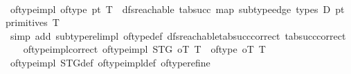 \begin{isabellebody}
\endisatagproof
{\isafoldproof}%
%
\isadelimproof
\isanewline
%
\endisadelimproof
\isanewline
\ \ \isamarkupfalse%
\ of{\isacharunderscore}{\kern0pt}type{}{\isacharunderscore}{\kern0pt}impl{\isacharcolon}{\kern0pt}\ {\isachardoublequoteopen}of{\isacharunderscore}{\kern0pt}type{}\ pt\ T\ {\isasymlongleftrightarrow}\ dfs{\isacharunderscore}{\kern0pt}reachable\ {\isacharparenleft}{\kern0pt}tab{\isacharunderscore}{\kern0pt}succ\ {\isacharparenleft}{\kern0pt}map\ subtype{\isacharunderscore}{\kern0pt}edge\ {\isacharparenleft}{\kern0pt}types\ D{\isacharparenright}{\kern0pt}{\isacharparenright}{\kern0pt}{\isacharparenright}{\kern0pt}\ {\isacharparenleft}{\kern0pt}{\isacharparenleft}{\kern0pt}{\isacharequal}{\kern0pt}{\isacharparenright}{\kern0pt}pt{\isacharparenright}{\kern0pt}\ {\isacharparenleft}{\kern0pt}primitives\ T{\isacharparenright}{\kern0pt}{\isachardoublequoteclose}\isanewline
%
\isadelimproof
\ \ \ \ %
\endisadelimproof
%
\isatagproof
{}\isamarkupfalse%
\ {\isacharparenleft}{\kern0pt}simp\ add{\isacharcolon}{\kern0pt}\ subtype{\isacharunderscore}{\kern0pt}rel{\isacharunderscore}{\kern0pt}impl\ of{\isacharunderscore}{\kern0pt}type{}{\isacharunderscore}{\kern0pt}def\ dfs{\isacharunderscore}{\kern0pt}reachable{\isacharunderscore}{\kern0pt}tab{\isacharunderscore}{\kern0pt}succ{\isacharunderscore}{\kern0pt}correct\ tab{\isacharunderscore}{\kern0pt}succ{\isacharunderscore}{\kern0pt}correct{\isacharparenright}{\kern0pt}%
\endisatagproof
{\isafoldproof}%
%
\isadelimproof
\isanewline
%
\endisadelimproof
\isanewline
\ \ \isamarkupfalse%
\ of{\isacharunderscore}{\kern0pt}type{\isacharunderscore}{\kern0pt}impl{\isacharunderscore}{\kern0pt}correct{\isacharcolon}{\kern0pt}\ {\isachardoublequoteopen}of{\isacharunderscore}{\kern0pt}type{\isacharunderscore}{\kern0pt}impl\ STG\ oT\ T\ {\isasymlongleftrightarrow}\ of{\isacharunderscore}{\kern0pt}type\ oT\ T{\isachardoublequoteclose}\isanewline
%
\isadelimproof
\ \ \ \ %
\endisadelimproof
%
\isatagproof
{}\isamarkupfalse%
\ of{\isacharunderscore}{\kern0pt}type{}{\isacharunderscore}{\kern0pt}impl\ STG{\isacharunderscore}{\kern0pt}def\ of{\isacharunderscore}{\kern0pt}type{\isacharunderscore}{\kern0pt}impl{\isacharunderscore}{\kern0pt}def\ of{\isacharunderscore}{\kern0pt}type{\isacharunderscore}{\kern0pt}refine{}\ \isakeywordONE{{\isachardot}{\kern0pt}{\isachardot}{\kern0pt}}\isamarkupfalse%
%
\endisatagproof
{\isafoldproof}%
%
\isadelimproof
\isanewline
%
\endisadelimproof
\isanewline

\end{isabellebody}
